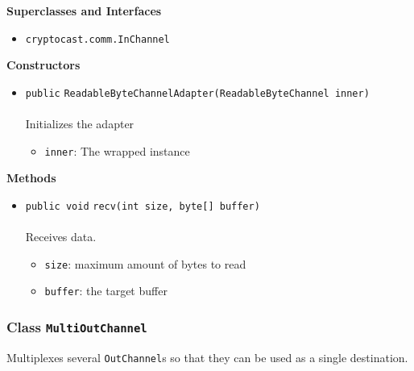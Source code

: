 \textbf{\sffamily Superclasses and Interfaces}
\begin{itemize}
\item \lstinline|cryptocast.comm.InChannel|
\end{itemize}


\textbf{\sffamily Constructors}
\begin{itemize}
\item \lstinline|public| \lstinline|ReadableByteChannelAdapter|\lstinline|(ReadableByteChannel inner)|\\ \\[-0.6em]
Initializes the adapter
\begin{itemize}
\item \lstinline|inner|: The wrapped instance
\end{itemize}



\end{itemize}


\textbf{\sffamily Methods}
\begin{itemize}
\item \lstinline|public void| \lstinline|recv|\lstinline|(int size, byte[] buffer)|\\ \\[-0.6em]
Receives data.
\begin{itemize}
\item \lstinline|size|: maximum amount of bytes to read
\item \lstinline|buffer|: the target buffer
\end{itemize}



\end{itemize}

\subsubsection{Class \lstinline|MultiOutChannel|}
Multiplexes several \lstinline|OutChannel|s so that they can be used as a single
 destination. \\
\noindent\begin{minipage}[t]{5cm}
\vspace{0.3em}
\hspace*{2em}
\vspace{0.3em}
\end{minipage}



